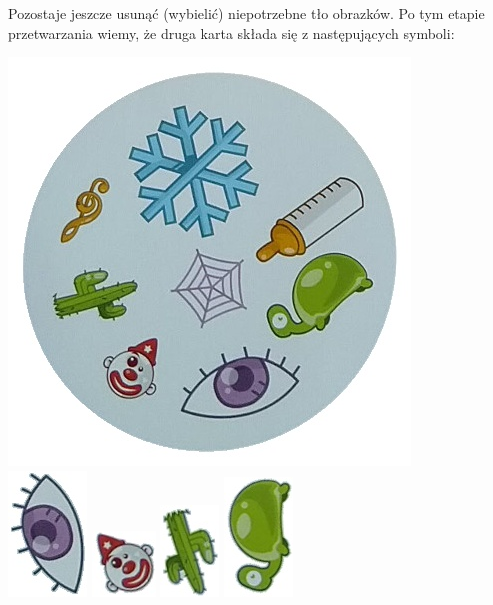 \documentclass[10pt,a4paper]{article}
\begin{document}
Pozostaje jeszcze usunąć (wybielić) niepotrzebne tło obrazków. Po tym etapie przetwarzania wiemy, że druga karta składa się z następujących symboli:
\begin{center}
\includegraphics[scale=0.4]{2.1/card1.jpg} \\
\includegraphics[scale=0.5]{2.1/card1sign0.jpg}
\includegraphics[scale=0.5]{2.1/card1sign1.jpg}
\includegraphics[scale=0.5]{2.1/card1sign2.jpg}
\includegraphics[scale=0.5]{2.1/card1sign3.jpg}

\end{center}
\end{document}
